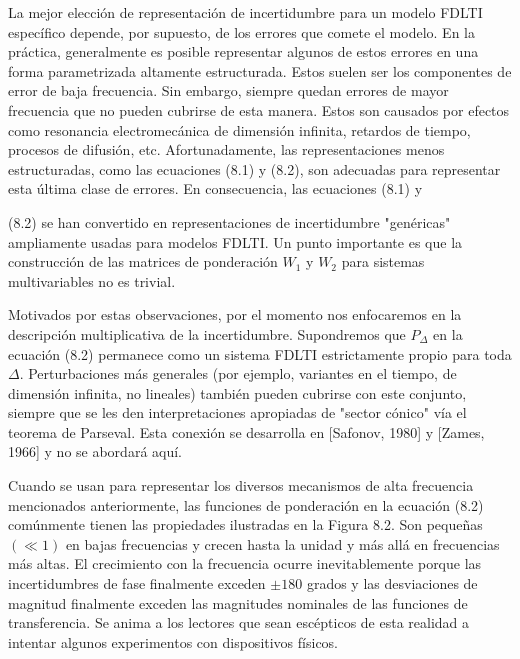 
La mejor elección de representación de incertidumbre para un modelo FDLTI específico depende, por supuesto, de los errores que comete el modelo. En la práctica, generalmente es posible representar algunos de estos errores en una forma parametrizada altamente estructurada. Estos suelen ser los componentes de error de baja frecuencia. Sin embargo, siempre quedan errores de mayor frecuencia que no pueden cubrirse de esta manera. Estos son causados por efectos como resonancia electromecánica de dimensión infinita, retardos de tiempo, procesos de difusión, etc. Afortunadamente, las representaciones menos estructuradas, como las ecuaciones (8.1) y (8.2), son adecuadas para representar esta última clase de errores. En consecuencia, las ecuaciones (8.1) y

(8.2) se han convertido en representaciones de incertidumbre "genéricas" ampliamente usadas para modelos FDLTI. Un punto importante es que la construcción de las matrices de ponderación $W_{1}$ y $W_{2}$ para sistemas multivariables no es trivial.

Motivados por estas observaciones, por el momento nos enfocaremos en la descripción multiplicativa de la incertidumbre. Supondremos que $P_{\Delta}$ en la ecuación (8.2) permanece como un sistema FDLTI estrictamente propio para toda $\Delta$. Perturbaciones más generales (por ejemplo, variantes en el tiempo, de dimensión infinita, no lineales) también pueden cubrirse con este conjunto, siempre que se les den interpretaciones apropiadas de "sector cónico" vía el teorema de Parseval. Esta conexión se desarrolla en [Safonov, 1980] y [Zames, 1966] y no se abordará aquí.

Cuando se usan para representar los diversos mecanismos de alta frecuencia mencionados anteriormente, las funciones de ponderación en la ecuación (8.2) comúnmente tienen las propiedades ilustradas en la Figura 8.2. Son pequeñas $(\ll 1)$ en bajas frecuencias y crecen hasta la unidad y más allá en frecuencias más altas. El crecimiento con la frecuencia ocurre inevitablemente porque las incertidumbres de fase finalmente exceden $\pm 180$ grados y las desviaciones de magnitud finalmente exceden las magnitudes nominales de las funciones de transferencia. Se anima a los lectores que sean escépticos de esta realidad a intentar algunos experimentos con dispositivos físicos.

